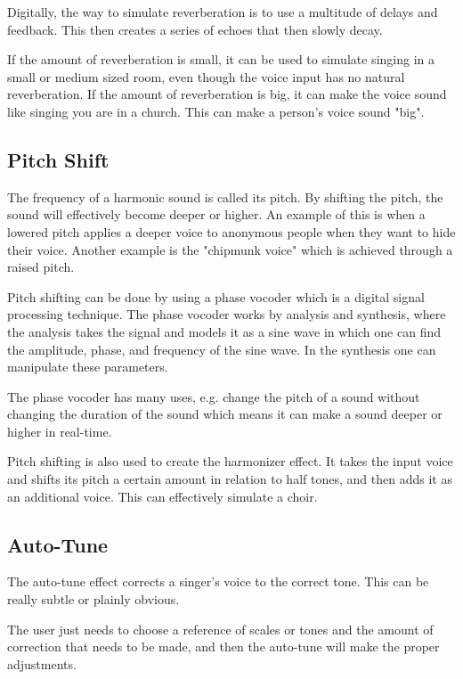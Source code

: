 Digitally, the way to simulate reverberation is to use a multitude of delays and feedback. This then creates a series of echoes that then slowly decay. 

If the amount of reverberation is small, it can be used to simulate singing in a small or medium sized room, even though the voice input has no natural reverberation. If the amount of reverberation is big, it can make the voice sound like singing you are in a church. This can make a person's voice sound "big".

\subsection{Pitch Shift}

The frequency of a harmonic sound is called its pitch\citep{Katjaas_00}. By shifting the pitch, the sound will effectively become deeper or higher. An example of this is when a lowered pitch applies a deeper voice to anonymous people when they want to hide their voice. Another example is the "chipmunk voice" which is achieved through a raised pitch.

Pitch shifting can be done by using a phase vocoder which is a digital signal processing technique\citep{dolson}. The phase vocoder works by analysis and synthesis, where the analysis takes the signal and models it as a sine wave in which one can find the amplitude, phase, and frequency of the sine wave. In the synthesis one can manipulate these parameters. 

The phase vocoder has many uses, e.g. change the pitch of a sound without changing the duration of the sound which means it can make a sound deeper or higher in real-time. 

Pitch shifting is also used to create the harmonizer effect. It takes the input voice and shifts its pitch a certain amount in relation to half tones, and then adds it as an additional voice. This can effectively simulate a choir.

\subsection{Auto-Tune}

The auto-tune effect corrects a singer's voice to the correct tone\citep{Hadhazy_2010}. This can be really subtle or plainly obvious. 

The user just needs to choose a reference of scales or tones and the amount of correction that needs to be made, and then the auto-tune will make the proper adjustments.

